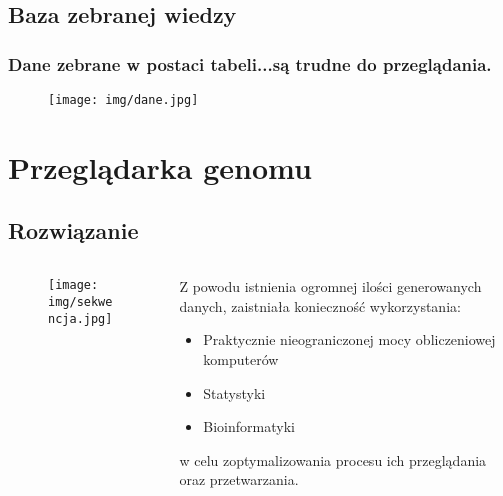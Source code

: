 \documentclass{beamer}
\begin{document}
\subsection{Baza zebranej wiedzy}
\begin{frame}\frametitle{Dane zebrane w postaci tabeli...są trudne do przeglądania.}
	\begin{figure}[htb]
		\begin{center}
	  		\texttt{[image: img/dane.jpg]}
		\end{center}
	\end{figure}
\end{frame}


\section{Przeglądarka genomu}
\subsection{Rozwiązanie}
\begin{frame}
	\begin{columns}
		\begin{column}{6cm}
			\begin{figure}[htb]
	  			\begin{center}
	  				\texttt{[image: img/sekwencja.jpg]}
	  			\end{center}
	        \end{figure}
    	\end{column}
    	\begin{column}{6cm}
			Z powodu istnienia ogromnej ilości generowanych danych, zaistniała konieczność wykorzystania:
			\begin{itemize}
				\item Praktycznie nieograniczonej mocy obliczeniowej komputerów
				\item Statystyki
				\item Bioinformatyki
			\end{itemize}
			w celu zoptymalizowania procesu ich przeglądania oraz przetwarzania.
		\end{column}
	\end{columns}
\end{frame}
\end{document}
